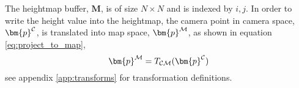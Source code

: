     The heightmap buffer, \(\bm{M}\), is of size \(N \times N\) and is indexed by \(i,j\). In order to write the height value into the heightmap, the camera point in camera space,
    \(\bm{p}\inrefframe{\fcamera}\), is translated into map space, \(\bm{p}\inrefframe{\fmap}\), as shown in equation \ref{eq:project_to_map},
    \begin{equation} \label{eq:project_to_map}
        \bm{p}\inrefframe{\fmap} = \transframe{\bm{p}\inrefframe{\fcamera}}{\fcamera}{\fmap}
    \end{equation}
    see appendix \ref{app:transforms} for transformation definitions.


